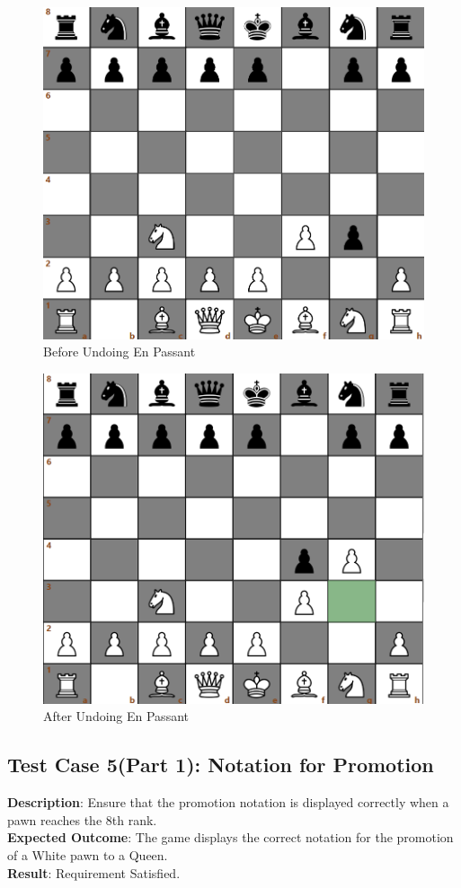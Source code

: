 \documentclass[a4paper,12pt]{article}
\begin{document}
\begin{figure}[H]
    \centering
    \includegraphics[width=0.7\linewidth]{Images/Test Cases/testCase4Img1.png}
    \caption{Before Undoing En Passant}
    \label{fig:BeforeEnPassantUndo}
\end{figure}

\begin{figure}[H]
    \centering
    \includegraphics[width=0.7\linewidth]{Images/Test Cases/testCase4Img2.png}
    \caption{After Undoing En Passant}
    \label{fig:AfterEnPassantUndo}
\end{figure}

\subsection{Test Case 5(Part 1): Notation for Promotion}
\textbf{Description}: Ensure that the promotion notation is displayed correctly when a pawn reaches the 8th rank.\\
\textbf{Expected Outcome}: The game displays the correct notation for the promotion of a White pawn to a Queen.\\
\textbf{Result}: Requirement Satisfied.
\end{document}
